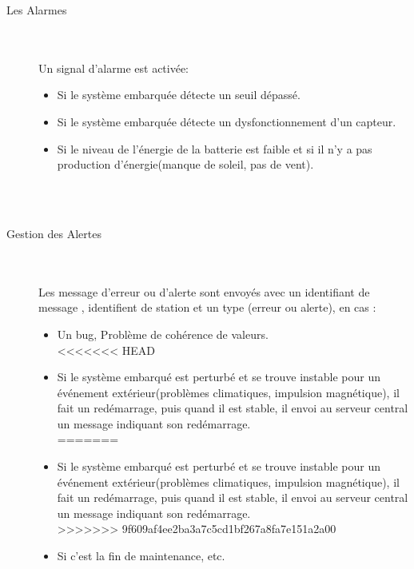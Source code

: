 \documentclass [a4paper] {report}
\begin{document}
\begin{description}
\item [Les Alarmes]\hfill\\
	\\ Un signal d'alarme est activée:\\
	\begin{itemize}
		\item Si le système embarquée détecte un seuil dépassé.\\
		\item Si le système embarquée détecte un dysfonctionnement d'un capteur.\\
		\item Si le niveau de l'énergie de la batterie est faible et si il n'y a pas production d'énergie(manque de soleil, pas de vent).\\
	\end{itemize}\\
\hfill\\
\item [Gestion des Alertes]\hfill\\
	\\ Les message d'erreur ou d'alerte sont envoyés avec un identifiant de message , identifient de station et un type (erreur ou alerte), en cas  :
		\begin{itemize}
		\item Un bug, Problème de cohérence de valeurs.\\
<<<<<<< HEAD
		\item Si le système embarqué est perturbé et se trouve instable pour un événement extérieur(problèmes climatiques, 
		impulsion magnétique), il fait un redémarrage, puis quand il est stable, il envoi au serveur central un message indiquant son redémarrage.  \\
=======
		\item Si le système embarqué est perturbé et se trouve instable pour un événement extérieur(problèmes climatiques, impulsion magnétique), il fait un redémarrage, puis quand il est stable, il envoi au serveur central un message indiquant son redémarrage.  \\
>>>>>>> 9f609af4ee2ba3a7c5cd1bf267a8fa7e151a2a00
		\item Si c'est la fin de maintenance, etc.\\\\
	\end{itemize}	\\


\end{description}
\end{document}
